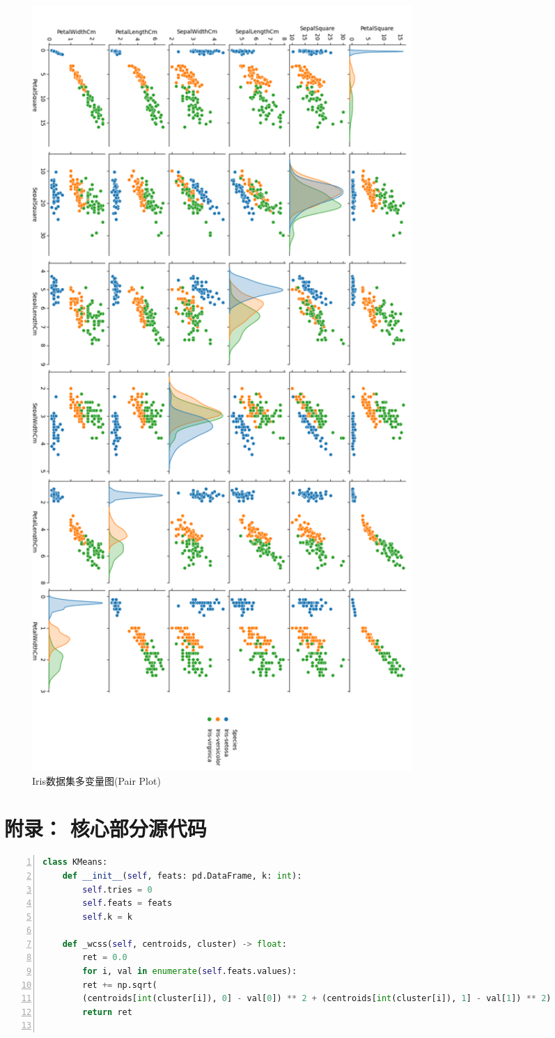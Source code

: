 \documentclass[a4paper,twoside]{article}
\begin{document}
\begin{spacing}{1.2}
\begin{figure}[H] 
	\centering
	\includegraphics[width=0.7\textwidth]{../pairplot.png} 
	\caption{Iris数据集多变量图(Pair Plot)}
	\label{Fig.pairplot}
\end{figure}

\section{附录： 核心部分源代码}
\label{sec:appB}

\begin{lstlisting}[language=Python,numbers=left,style=PythonStyle,caption=瑞利分布生成,label={code:kmeans}]
class KMeans:
	def __init__(self, feats: pd.DataFrame, k: int):
		self.tries = 0
		self.feats = feats
		self.k = k
	
	def _wcss(self, centroids, cluster) -> float:
		ret = 0.0
		for i, val in enumerate(self.feats.values):
		ret += np.sqrt(
		(centroids[int(cluster[i]), 0] - val[0]) ** 2 + (centroids[int(cluster[i]), 1] - val[1]) ** 2)
		return ret
	

\end{lstlisting}
\end{spacing}
\end{document}
